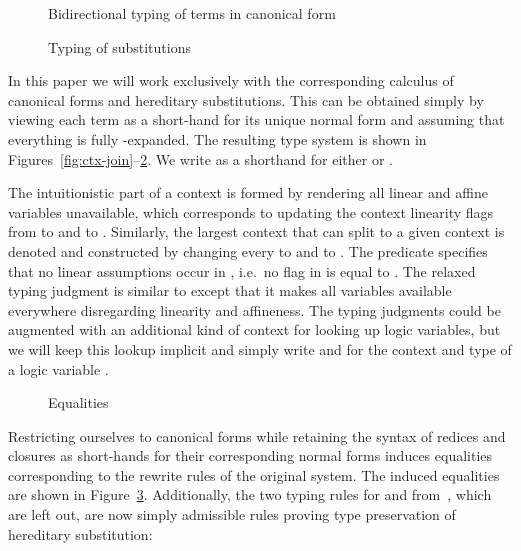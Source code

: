 \documentclass{eptcs}
\theoremstyle{definition}
\begin{document}
\begin{figure}[t]





\caption{Bidirectional typing of terms in canonical form\label{fig:typ-term}}
\end{figure} 

\begin{figure}[t]



\caption{Typing of substitutions\label{fig:typ-sub}}
\end{figure} 

In this paper we will work exclusively with the corresponding calculus of canonical
forms and hereditary substitutions.  This can be obtained simply by
viewing each term as a short-hand for its unique normal form and
assuming that everything is fully -expanded.  The resulting type
system is shown in Figures~\ref{fig:ctx-join}--\ref{fig:typ-sub}.
We write  as a shorthand for either 
or .

The intuitionistic part of a context  is formed by
rendering all linear and affine variables unavailable, which corresponds to updating
the context linearity flags from
 to  and  to .
Similarly, the largest context that can split to a given context is
denoted  and constructed by changing every
 to  and  to .
The predicate  specifies that no linear
assumptions occur in , i.e.\ no flag in  is equal to
.  The relaxed typing judgment  is
similar to  except that it makes all variables
available everywhere disregarding linearity and affineness.
The typing judgments could be augmented with an additional kind of
context for looking up logic variables, but we will keep this lookup
implicit and simply write  and  for the context and type
of a logic variable .

\begin{figure}

\caption{Equalities\label{fig:equalities}}
\end{figure} 

Restricting ourselves to canonical forms while retaining the syntax of
redices and closures as short-hands for their corresponding normal forms
induces equalities corresponding to the rewrite rules of the original
system.  The induced equalities are shown in Figure~\ref{fig:equalities}.
Additionally, the two typing rules for  and  from~\cite{SchackNielsen10ijcar},
which are left out, are now simply admissible rules proving type
preservation of hereditary substitution:
\end{document}

